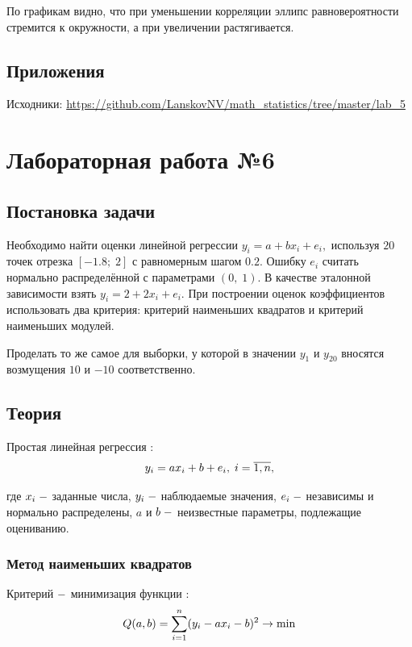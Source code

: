 \documentclass[12pt]{report}
\begin{document}
По графикам видно, что при уменьшении корреляции эллипс равновероятности стремится к окружности, а при увеличении растягивается.

\section{Приложения}

Исходники: \url{https://github.com/LanskovNV/math_statistics/tree/master/lab_5}

\chapter{Лабораторная работа №6}
\section{Постановка задачи}

Необходимо найти оценки линейной регрессии $y_i=a+bx_i+e_i,$ используя $20$ точек отрезка $[-1.8;\;2]$ с равномерным шагом $0.2.$ Ошибку $e_i$ считать нормально распределённой с параметрами $(0,\;1).$ В качестве эталонной зависимости взять $y_i=2+2x_i+e_i.$ При построении оценок коэффициентов использовать два критерия: критерий наименьших квадратов и критерий наименьших модулей.

Проделать то же самое для выборки, у которой в значении $y_1$ и $y_{20}$ вносятся возмущения $10$ и $-10$ соответственно.

\section{Теория}

Простая линейная регрессия \cite{lin_reg}:
\begin{equation}
    y_i=ax_i+b+e_i,\;i=\overline{1,n},\hfill
\end{equation}

где $x_i\;\--$ заданные числа, $y_i\;\--$ наблюдаемые значения, $e_i\;\--$ независимы и нормально распределены, $a$ и $b\;\--$ неизвестные параметры, подлежащие оцениванию.

\subsection{Метод наименьших квадратов}

Критерий $\--$ минимизация функции \cite{MNK}:
\begin{equation}
    Q(a,b)=\sum\limits_{i=1}^n(y_i-ax_i-b)^2\to \min\hfill
\end{equation}
\end{document}
